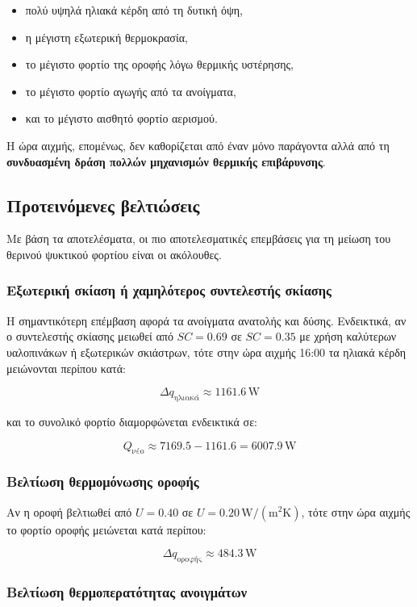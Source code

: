 \documentclass[12pt,a4paper]{article}
\begin{document}
\begin{itemize}
\item πολύ υψηλά ηλιακά κέρδη από τη δυτική όψη,
\item η μέγιστη εξωτερική θερμοκρασία,
\item το μέγιστο φορτίο της οροφής λόγω θερμικής υστέρησης,
\item το μέγιστο φορτίο αγωγής από τα ανοίγματα,
\item και το μέγιστο αισθητό φορτίο αερισμού.
\end{itemize}

Η ώρα αιχμής, επομένως, δεν καθορίζεται από έναν μόνο παράγοντα αλλά από τη
\textbf{συνδυασμένη δράση πολλών μηχανισμών θερμικής επιβάρυνσης}.

\subsection{Προτεινόμενες βελτιώσεις}

Με βάση τα αποτελέσματα, οι πιο αποτελεσματικές επεμβάσεις για τη μείωση του θερινού
ψυκτικού φορτίου είναι οι ακόλουθες.

\subsubsection{Εξωτερική σκίαση ή χαμηλότερος συντελεστής σκίασης}

Η σημαντικότερη επέμβαση αφορά τα ανοίγματα ανατολής και δύσης. Ενδεικτικά, αν ο
συντελεστής σκίασης μειωθεί από \(SC=0.69\) σε \(SC=0.35\) με χρήση καλύτερων
υαλοπινάκων ή εξωτερικών σκιάστρων, τότε στην ώρα αιχμής 16:00 τα ηλιακά κέρδη
μειώνονται περίπου κατά:

\[
\Delta q_{\text{ηλιακά}} \approx 1161.6\,\mathrm{W}
\]

και το συνολικό φορτίο διαμορφώνεται ενδεικτικά σε:

\[
Q_{\text{νέο}} \approx 7169.5 - 1161.6 = 6007.9\,\mathrm{W}
\]

\subsubsection{Βελτίωση θερμομόνωσης οροφής}

Αν η οροφή βελτιωθεί από \(U = 0.40\) σε \(U = 0.20\,\mathrm{W/(m^2K)}\), τότε στην ώρα
αιχμής το φορτίο οροφής μειώνεται κατά περίπου:

\[
\Delta q_{\text{οροφής}} \approx 484.3\,\mathrm{W}
\]

\subsubsection{Βελτίωση θερμοπερατότητας ανοιγμάτων}
\end{document}
